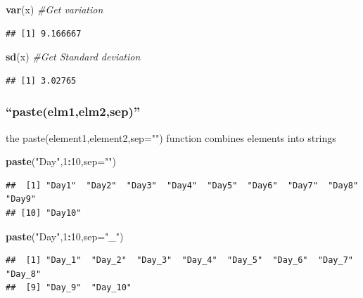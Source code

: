 \documentclass[]{article}
\newenvironment{Shaded}{\begin{snugshade}}{\end{snugshade}}
\newcommand{\CommentTok}[1]{\textcolor[rgb]{0.56,0.35,0.01}{\textit{#1}}}
\newcommand{\DataTypeTok}[1]{\textcolor[rgb]{0.13,0.29,0.53}{#1}}
\newcommand{\DecValTok}[1]{\textcolor[rgb]{0.00,0.00,0.81}{#1}}
\newcommand{\KeywordTok}[1]{\textcolor[rgb]{0.13,0.29,0.53}{\textbf{#1}}}
\newcommand{\NormalTok}[1]{#1}
\newcommand{\OperatorTok}[1]{\textcolor[rgb]{0.81,0.36,0.00}{\textbf{#1}}}
\newcommand{\StringTok}[1]{\textcolor[rgb]{0.31,0.60,0.02}{#1}}
\begin{document}
\begin{Shaded}
\begin{Highlighting}[]
\KeywordTok{var}\NormalTok{(x) }\CommentTok{#Get variation}
\end{Highlighting}
\end{Shaded}

\begin{verbatim}
## [1] 9.166667
\end{verbatim}

\begin{Shaded}
\begin{Highlighting}[]
\KeywordTok{sd}\NormalTok{(x) }\CommentTok{#Get Standard deviation}
\end{Highlighting}
\end{Shaded}

\begin{verbatim}
## [1] 3.02765
\end{verbatim}

\hypertarget{pasteelm1elm2sep}{%
\subsubsection{``paste(elm1,elm2,sep)''}\label{pasteelm1elm2sep}}

the paste(element1,element2,sep="") function combines elements into
strings

\begin{Shaded}
\begin{Highlighting}[]
\KeywordTok{paste}\NormalTok{(}\StringTok{"Day"}\NormalTok{,}\DecValTok{1}\OperatorTok{:}\DecValTok{10}\NormalTok{,}\DataTypeTok{sep=}\StringTok{""}\NormalTok{)}
\end{Highlighting}
\end{Shaded}

\begin{verbatim}
##  [1] "Day1"  "Day2"  "Day3"  "Day4"  "Day5"  "Day6"  "Day7"  "Day8"  "Day9" 
## [10] "Day10"
\end{verbatim}

\begin{Shaded}
\begin{Highlighting}[]
\KeywordTok{paste}\NormalTok{(}\StringTok{"Day"}\NormalTok{,}\DecValTok{1}\OperatorTok{:}\DecValTok{10}\NormalTok{,}\DataTypeTok{sep=}\StringTok{"_"}\NormalTok{)}
\end{Highlighting}
\end{Shaded}

\begin{verbatim}
##  [1] "Day_1"  "Day_2"  "Day_3"  "Day_4"  "Day_5"  "Day_6"  "Day_7"  "Day_8" 
##  [9] "Day_9"  "Day_10"
\end{verbatim}
\end{document}
